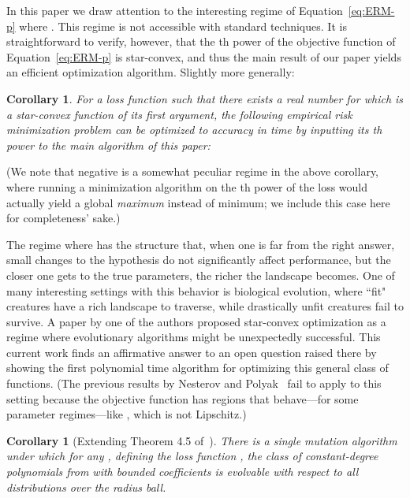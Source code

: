 \documentclass[11pt,letter]{article}
\newcounter{nTheorems}
\numberwithin{nTheorems}{section}
\newtheorem{corollary}[nTheorems]{Corollary}
\begin{document}
In this paper we draw attention to the interesting regime of Equation~\ref{eq:ERM-p} where . This regime is not accessible with standard techniques. It is straightforward to verify, however, that the th power of the objective function of Equation~\ref{eq:ERM-p} is star-convex, and thus the main result of our paper yields an efficient optimization algorithm. Slightly more generally:

\begin{corollary}
  For a loss function  such that there exists a real number  for which  is a star-convex function of its first argument, the following empirical risk minimization problem can be optimized to accuracy  in time  by inputting its th power to the main algorithm of this paper:
  
\end{corollary}

(We note that negative  is a somewhat peculiar regime in the above corollary, where running a minimization algorithm on the th power of the loss would actually yield a global \emph{maximum} instead of minimum; we include this case here for completeness' sake.)

The regime where  has the structure that, when one is far from the right answer, small changes to the hypothesis do not significantly affect performance, but the closer one gets to the true parameters, the richer the landscape becomes. One of many interesting settings with this behavior is biological evolution, where ``fit" creatures have a rich landscape to traverse, while drastically unfit creatures fail to survive. A paper by one of the authors proposed star-convex optimization as a regime where evolutionary algorithms might be unexpectedly successful. This current work finds an affirmative answer to an open question raised there by showing the first polynomial time algorithm for optimizing this general class of functions. (The previous results by Nesterov and Polyak~\cite{Nesterov:2006} fail to apply to this setting because the objective function has regions that behave---for some parameter regimes---like , which is not Lipschitz.)

\begin{corollary}[Extending Theorem 4.5 of~\cite{Valiant:2014}]
There is a single mutation algorithm under which for any , defining the loss function , the class of constant-degree polynomials from  with bounded coefficients is evolvable with respect to all distributions over the radius  ball.
\end{corollary}
\end{document}
